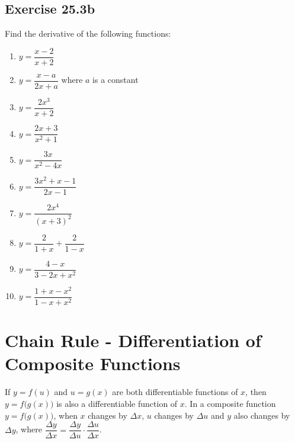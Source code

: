 \documentclass[12pt]{report}
\begin{document}
\subsection*{Exercise 25.3b}
\noindent Find the derivative of the following functions:
\setlength{\columnseprule}{1pt}
\setlength{\columnsep}{24pt}
\begin{multicols}{2}
  \begin{enumerate}
    \item $y={\dfrac{x-2}{x+2}}$
    \item $y={\dfrac{x-a}{2x+a}}$ where $a$ is a constant
    \item $y={\dfrac{2x^{3}}{x+2}}$
    \item $y={\dfrac{2x+3}{x^{2}+1}}$
    \item $y={\dfrac{3x}{x^{2}-4x}}$
    \item $y={\dfrac{3x^{2}+x-1}{2x-1}}$
    \item $y={\dfrac{2x^{4}}{\left(x+3\right)^{2}}}$
    \item $y={\dfrac{2}{1+x}}+{\dfrac{2}{1-x}}$
    \item $y={\dfrac{4-x}{3-2x+x^{2}}}$
    \item $y={\dfrac{1+x-x^{2}}{1-x+x^{2}}}$
  \end{enumerate}
\end{multicols}

\section{Chain Rule - Differentiation of Composite Functions}

If $y = f(u)$ and $u = g(x)$ are both differentiable functions of $x$, then $y
  = f\bigl(g(x)\bigr)$ is also a differentiable function of $x$. In a composite
function $y = f\bigl(g(x)\bigr)$, when $x$ changes by $\Delta x$, $u$ changes
by $\Delta u$ and $y$ also changes by $\Delta y$, where $\dfrac{\Delta
    y}{\Delta x} = \dfrac{\Delta y}{\Delta u} \cdot \dfrac{\Delta u}{\Delta x}$.
\end{document}
